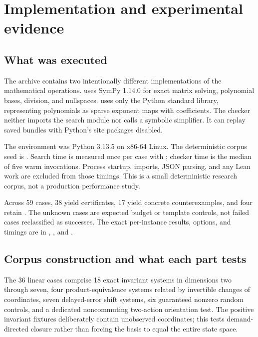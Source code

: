 \section{Implementation and experimental evidence}
\label{sec:experiments}

\subsection{What was executed}

The archive contains two intentionally different implementations of the
mathematical operations.  uses SymPy 1.14.0 for exact
matrix solving, polynomial bases, division, and nullspaces.
 uses only the Python standard library, representing
polynomials as sparse exponent maps with  coefficients. The
checker neither imports the search module nor calls a symbolic simplifier. It
can replay saved bundles with Python's site packages disabled.

The environment was Python 3.13.5 on x86-64 Linux. The deterministic corpus seed
is . Search time is measured once per case with
; checker time is the median of five warm invocations.
Process startup, imports, JSON parsing, and any Lean work are excluded from those
timings. This is a small deterministic research corpus, not a production
performance study.

\begin{table}[ht]
\centering\small

\caption{Recorded outcomes. Timing columns are medians over the successful
instances in each family; the checker entry for each instance is itself a median
of five warm runs. Cex. means independently replayed counterexample.}
\label{tab:metrics}
\end{table}

Across 59 cases, 38 yield certificates, 17 yield concrete counterexamples, and
four retain \Unknown. The unknown cases are expected budget or template
controls, not failed cases reclassified as successes. The exact per-instance
results, options, and timings are in ,
, and .

\subsection{Corpus construction and what each part tests}

The 36 linear cases comprise 18 exact invariant systems in dimensions two
through seven, four product-equivalence systems related by invertible changes
of coordinates, seven delayed-error shift systems, six guaranteed nonzero
random controls, and a dedicated noncommuting two-action orientation test.
The positive invariant fixtures deliberately contain unobserved coordinates;
this tests demand-directed closure rather than forcing the basis to equal the
entire state space.

